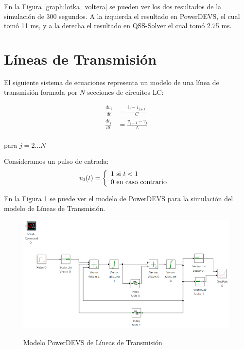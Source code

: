 En la Figura \ref{graph:lotka_voltera} se pueden ver los dos resultados de la simulación de 300 segundos. A la izquierda el resultado en PowerDEVS, el cual tomó 11 ms,
y a la derecha el resultado en QSS-Solver el cual tomó 2.75 ms.

\section{Líneas de Transmisión}
	El siguiente sistema de ecuaciones representa un modelo de una línea de transmisión formada por $N$ secciones de circuitos LC:

\begin{equation}
\begin{split}
\frac{d v_{j}}{d t} &= \frac{i_{j} - i_{j+1}}{C} \\
\frac{d i_{j}}{d t} &= \frac{v_{j-1} - v_{j}}{L} \\	
\end{split}
\end{equation}

para $j = 2 \dots N$

Consideramos un pulso de entrada:
\begin{equation}
v_0(t) = \left\{ 
  \begin{array}{l l}
    1 \text{ si } t < 1 \\
    0 \text{ en caso contrario }
  \end{array} \right.
\end{equation}

En la Figura \ref{model:lclines} se puede ver el modelo de PowerDEVS para la simulación del modelo de Líneas de Transmisión.

\begin{figure}[H]
 \includegraphics[width=0.75\linewidth]{lclines}
\label{model:lclines}
\caption{Modelo PowerDEVS de Líneas de Transmisión}
\end{figure}

